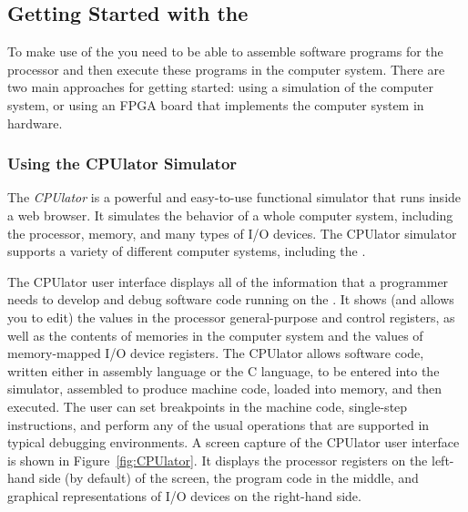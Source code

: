 


\subsection{Getting Started with the \systemNameFull}

To make use of the {\it \systemNameFull} you need to be able to assemble software programs 
for the {\processor} processor and then execute these programs in the computer system. There are 
two main approaches for getting started: using a simulation of the computer system, or
using an FPGA board that implements the computer system in hardware.

\subsubsection {Using the CPUlator Simulator}

The {\it CPUlator} is a powerful and easy-to-use functional simulator that runs inside a
web browser. It simulates the behavior of a whole computer system, including the
processor, memory, and many types of I/O devices. The CPUlator simulator supports a variety
of different computer systems, including the {\it \systemNameFull}. 

The CPUlator user interface displays all of the information that a programmer needs to
develop and debug software code running on the {\it \systemNameFull}. It shows (and allows
you to edit) the values in the processor general-purpose and control registers, as well as the 
contents of memories in the computer system and the values of memory-mapped I/O device 
registers. The CPUlator allows software code, written either in assembly language or the 
C language, to be entered into the simulator, assembled to produce machine code, loaded 
into memory, and then executed. The user can set breakpoints in the machine code, 
single-step instructions, and perform any of the usual operations that are supported in 
typical debugging environments. A screen capture of the CPUlator user interface is shown 
in Figure~\ref{fig:CPUlator}. It displays the processor registers on the 
left-hand side (by default) of the screen,
the program code in the middle, and graphical representations of I/O devices on the 
right-hand side.


